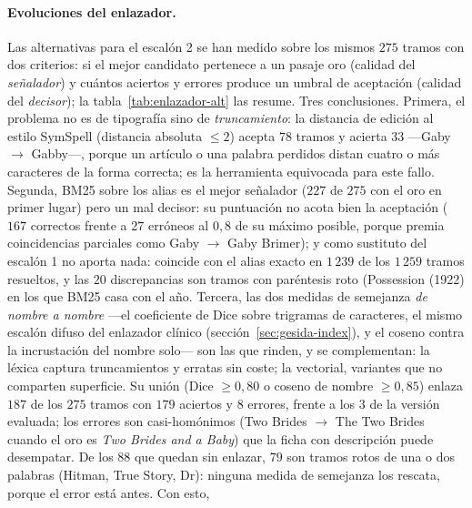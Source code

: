 \documentclass[11pt,a4paper]{article}
\begin{document}
\paragraph{Evoluciones del enlazador.}
Las alternativas para el escalón 2 se han medido sobre los mismos $275$
tramos con dos criterios: si el mejor candidato pertenece a un pasaje oro
(calidad del \emph{señalador}) y cuántos aciertos y errores produce un
umbral de aceptación (calidad del \emph{decisor});
la tabla~\ref{tab:enlazador-alt} las resume. Tres conclusiones. Primera,
el problema no es de tipografía sino de \emph{truncamiento}: la distancia
de edición al estilo SymSpell (distancia absoluta $\le 2$) acepta $78$
tramos y acierta $33$ ---\guillemotleft{}Gaby\guillemotright{} $\to$ \guillemotleft{}Gabby\guillemotright{}---, porque un
artículo o una palabra perdidos distan cuatro o más caracteres de la
forma correcta; es la herramienta equivocada para este fallo. Segunda,
BM25 sobre los alias es el mejor señalador ($227$ de $275$ con el oro en
primer lugar) pero un mal decisor: su puntuación no acota bien la
aceptación ($167$ correctos frente a $27$ erróneos al $0{,}8$ de su
máximo posible, porque premia coincidencias parciales como \guillemotleft{}Gaby\guillemotright{}
$\to$ \guillemotleft{}Gaby Brimer\guillemotright{}); y como sustituto del escalón 1 no aporta nada:
coincide con el alias exacto en $1\,239$ de los $1\,259$ tramos resueltos,
y las $20$ discrepancias son tramos con paréntesis roto (\guillemotleft{}Possession
(1922\guillemotright{}) en los que BM25 casa con el año. Tercera, las dos medidas de
semejanza \emph{de nombre a nombre} ---el coeficiente de Dice sobre
trigramas de caracteres, el mismo escalón difuso del enlazador clínico
(sección~\ref{sec:gesida-index}), y el coseno contra la incrustación del
nombre solo--- son las que rinden, y se complementan: la léxica captura
truncamientos y erratas sin coste; la vectorial, variantes que no
comparten superficie. Su unión (Dice $\ge 0{,}80$ o coseno de nombre
$\ge 0{,}85$) enlaza $187$ de los $275$ tramos con $179$ aciertos y $8$
errores, frente a los $3$ de la versión evaluada; los errores son
casi-homónimos (\guillemotleft{}Two Brides\guillemotright{} $\to$ \guillemotleft{}The Two Brides\guillemotright{} cuando el
oro es \emph{Two Brides and a Baby}) que la ficha con descripción puede
desempatar. De los $88$ que quedan sin enlazar, $79$ son tramos rotos de
una o dos palabras (\guillemotleft{}Hitman\guillemotright{}, \guillemotleft{}True Story\guillemotright{}, \guillemotleft{}Dr\guillemotright{}): ninguna
medida de semejanza los rescata, porque el error está antes. Con esto,
\end{document}
